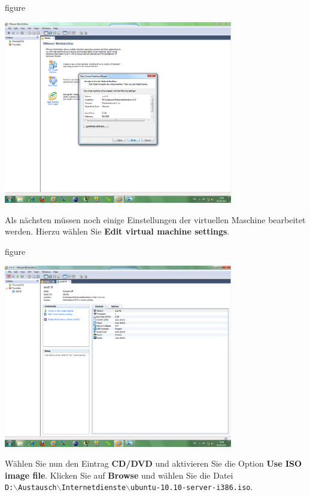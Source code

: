\begin{nofloat}{figure}
\begin{center}
\includegraphics[width=0.75\textwidth]{screenshots/vm07.png}
\end{center}
\end{nofloat}

Als nächsten müssen noch einige Einstellungen der virtuellen Maschine bearbeitet werden. Hierzu wählen Sie
\textbf{Edit virtual machine settings}.

\begin{nofloat}{figure}
\begin{center}
\includegraphics[width=0.75\textwidth]{screenshots/vm08.png}
\end{center}
\end{nofloat}

Wählen Sie nun den Eintrag \textbf{CD/DVD} und aktivieren Sie die Option \textbf{Use ISO image file}. Klicken Sie auf \textbf{Browse}
und wählen Sie die Datei \\
\texttt{D:$\backslash$Austausch$\backslash$Internetdienste$\backslash$ubuntu-10.10-server-i386.iso}.

